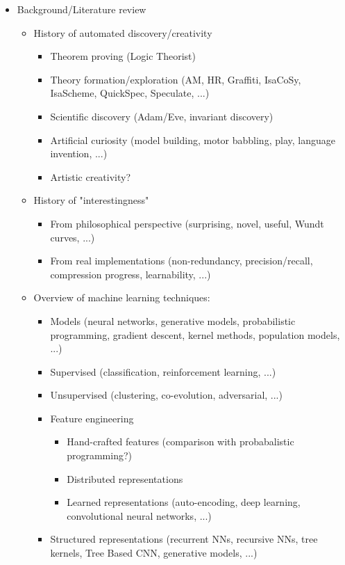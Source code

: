 \documentclass{article}
\begin{document}
\begin{itemize}
\item Background/Literature review
  \begin{itemize}
  \item History of automated discovery/creativity
    \begin{itemize}
    \item Theorem proving (Logic Theorist)
    \item Theory formation/exploration (AM, HR, Graffiti, IsaCoSy, IsaScheme,
      QuickSpec, Speculate, ...)
    \item Scientific discovery (Adam/Eve, invariant discovery)
    \item Artificial curiosity (model building, motor babbling, play, language invention, ...)
    \item Artistic creativity?
    \end{itemize}
  \item History of "interestingness"
    \begin{itemize}
    \item From philosophical perspective (surprising, novel, useful, Wundt
      curves, ...)
    \item From real implementations (non-redundancy, precision/recall,
      compression progress, learnability, ...)
    \end{itemize}
  \item Overview of machine learning techniques:
    \begin{itemize}
    \item Models (neural networks, generative models, probabilistic programming,
      gradient descent, kernel methods, population models, ...)
    \item Supervised (classification, reinforcement learning, ...)
    \item Unsupervised (clustering, co-evolution, adversarial, ...)
    \item Feature engineering
      \begin{itemize}
      \item Hand-crafted features (comparison with probabalistic programming?)
      \item Distributed representations
      \item Learned representations (auto-encoding, deep learning, convolutional
        neural networks, ...)
      \end{itemize}
    \item Structured representations (recurrent NNs, recursive NNs, tree
      kernels, Tree Based CNN, generative models, ...)

\end{itemize}
\end{itemize}
\end{itemize}
\end{document}
